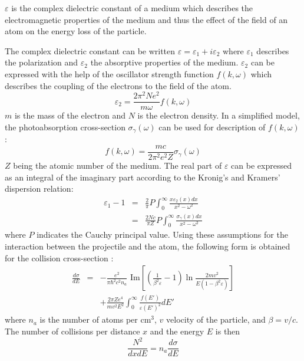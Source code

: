 $\varepsilon$ is the complex
dielectric constant of a medium which describes the
electromagnetic properties of
the medium and thus the effect of the field of an atom
on the energy loss of the particle.

The complex dielectric constant can be written $\varepsilon =
\varepsilon_1 + i \varepsilon_2$ where $\varepsilon_1$ describes
the polarization and $\varepsilon_2$ the absorptive properties
of the medium. $\varepsilon_2$ can be expressed with the
help of the oscillator strength function $f(k,\omega)$ which
describes the coupling of the electrons to the field of the
atom.
\begin{equation}
\label{eps2}
\varepsilon_2 = \frac{2 \pi^2 N e^2}{m \omega} f(k,\omega)
\end{equation}
$m$ is the mass of the electron and $N$ is the electron density.
In a simplified model, the photoabsorption cross-section
$\sigma_{\gamma}(\omega)$ can be used for description of $f(k,\omega)$:
\begin{equation}
f(k,\omega) = \frac{mc}{2\pi^2 e^2 Z} \sigma_{\gamma}(\omega)
\end{equation}
$Z$ being the atomic number of the medium.
The real part of $\varepsilon$ can be  expressed as an integral
of the imaginary part according to the Kronig's and Kramers' dispersion
relation\cite{bib-ALLIS}:
\begin{eqnarray}
\varepsilon_1 - 1 & = & \frac{2}{\pi} P \int_0^{\infty}
     \frac{x \varepsilon_2(x) dx}{x^2 - \omega^2} \nonumber \\
                  & = & \frac{2 N c}{\pi Z} P \int_0^{\infty}
     \frac{\sigma_{\gamma}(x) dx}{x^2 - \omega^2}
\label{eps1}
\end{eqnarray}
where $P$ indicates the Cauchy principal value.
Using these assumptions for the interaction between the projectile
and the atom, the
following form is obtained for the collision cross-section \cite{bib-GRISH}:
\begin{eqnarray}
\frac{d\sigma}{dE}     & = & - \frac{e^2}{\pi \hbar^2c^2n_a}
    \mbox{ Im} \left[ \left( \frac{1}{\beta^2\varepsilon} - 1 \right)
              \ln \frac{2mv^2}{E(1-\beta^2\varepsilon)} \right] \nonumber \\
& &  + \frac{2\pi Ze^4}{mv^2E^2} \int_0^{\infty}
    \frac{f(E')}{\varepsilon(E')^2} dE'
\label{xsection}
\end{eqnarray}
where $n_a$ is the number of atoms per cm$^3$, $v$ velocity of the particle,
and $\beta=v/c$. The number of collisions per distance $x$ and
the energy $E$ is then
\begin{equation}
\frac{N^2}{dx dE} = n_a \frac{d\sigma}{dE}
\end{equation}

